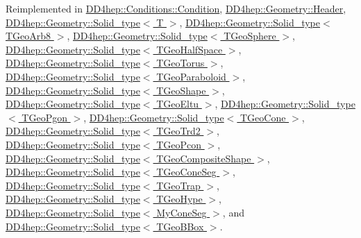 Reimplemented in \hyperlink{class_d_d4hep_1_1_conditions_1_1_condition_ab4b94316f4df66998b750336ab14dc90}{DD4hep::Conditions::Condition}, \hyperlink{class_d_d4hep_1_1_geometry_1_1_header_a56f8ff7aee494b00bb948dbc2cf55275}{DD4hep::Geometry::Header}, \hyperlink{class_d_d4hep_1_1_geometry_1_1_solid__type_a2e1c12b2d84add0bc77ced60600339aa}{DD4hep::Geometry::Solid\_\-type$<$ T $>$}, \hyperlink{class_d_d4hep_1_1_geometry_1_1_solid__type_a2e1c12b2d84add0bc77ced60600339aa}{DD4hep::Geometry::Solid\_\-type$<$ TGeoArb8 $>$}, \hyperlink{class_d_d4hep_1_1_geometry_1_1_solid__type_a2e1c12b2d84add0bc77ced60600339aa}{DD4hep::Geometry::Solid\_\-type$<$ TGeoSphere $>$}, \hyperlink{class_d_d4hep_1_1_geometry_1_1_solid__type_a2e1c12b2d84add0bc77ced60600339aa}{DD4hep::Geometry::Solid\_\-type$<$ TGeoHalfSpace $>$}, \hyperlink{class_d_d4hep_1_1_geometry_1_1_solid__type_a2e1c12b2d84add0bc77ced60600339aa}{DD4hep::Geometry::Solid\_\-type$<$ TGeoTorus $>$}, \hyperlink{class_d_d4hep_1_1_geometry_1_1_solid__type_a2e1c12b2d84add0bc77ced60600339aa}{DD4hep::Geometry::Solid\_\-type$<$ TGeoParaboloid $>$}, \hyperlink{class_d_d4hep_1_1_geometry_1_1_solid__type_a2e1c12b2d84add0bc77ced60600339aa}{DD4hep::Geometry::Solid\_\-type$<$ TGeoShape $>$}, \hyperlink{class_d_d4hep_1_1_geometry_1_1_solid__type_a2e1c12b2d84add0bc77ced60600339aa}{DD4hep::Geometry::Solid\_\-type$<$ TGeoEltu $>$}, \hyperlink{class_d_d4hep_1_1_geometry_1_1_solid__type_a2e1c12b2d84add0bc77ced60600339aa}{DD4hep::Geometry::Solid\_\-type$<$ TGeoPgon $>$}, \hyperlink{class_d_d4hep_1_1_geometry_1_1_solid__type_a2e1c12b2d84add0bc77ced60600339aa}{DD4hep::Geometry::Solid\_\-type$<$ TGeoCone $>$}, \hyperlink{class_d_d4hep_1_1_geometry_1_1_solid__type_a2e1c12b2d84add0bc77ced60600339aa}{DD4hep::Geometry::Solid\_\-type$<$ TGeoTrd2 $>$}, \hyperlink{class_d_d4hep_1_1_geometry_1_1_solid__type_a2e1c12b2d84add0bc77ced60600339aa}{DD4hep::Geometry::Solid\_\-type$<$ TGeoPcon $>$}, \hyperlink{class_d_d4hep_1_1_geometry_1_1_solid__type_a2e1c12b2d84add0bc77ced60600339aa}{DD4hep::Geometry::Solid\_\-type$<$ TGeoCompositeShape $>$}, \hyperlink{class_d_d4hep_1_1_geometry_1_1_solid__type_a2e1c12b2d84add0bc77ced60600339aa}{DD4hep::Geometry::Solid\_\-type$<$ TGeoConeSeg $>$}, \hyperlink{class_d_d4hep_1_1_geometry_1_1_solid__type_a2e1c12b2d84add0bc77ced60600339aa}{DD4hep::Geometry::Solid\_\-type$<$ TGeoTrap $>$}, \hyperlink{class_d_d4hep_1_1_geometry_1_1_solid__type_a2e1c12b2d84add0bc77ced60600339aa}{DD4hep::Geometry::Solid\_\-type$<$ TGeoHype $>$}, \hyperlink{class_d_d4hep_1_1_geometry_1_1_solid__type_a2e1c12b2d84add0bc77ced60600339aa}{DD4hep::Geometry::Solid\_\-type$<$ MyConeSeg $>$}, and \hyperlink{class_d_d4hep_1_1_geometry_1_1_solid__type_a2e1c12b2d84add0bc77ced60600339aa}{DD4hep::Geometry::Solid\_\-type$<$ TGeoBBox $>$}.

